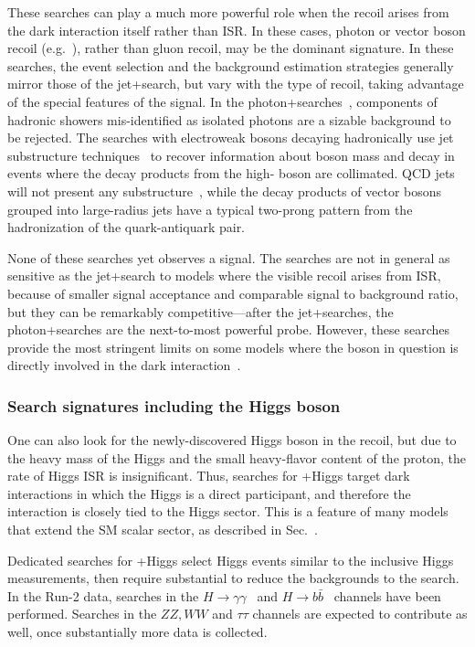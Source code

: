 These searches can play a much more powerful role when the recoil arises from the dark interaction itself rather than ISR.
In these cases, photon or vector boson recoil (e.g.~\cite{Birkedal:2004xn,Carpenter:2012rg}), rather than gluon recoil, may be the dominant signature.
In these searches, the event selection and the background estimation strategies generally mirror those of the jet+\MET search, but vary with the type of recoil, taking advantage of the special features of the signal.
In the photon+\MET searches~\cite{Aaboud:2017dor,CMS-PAS-EXO-16-014}, components of hadronic showers mis-identified as isolated photons are a sizable background to be rejected.
The searches with electroweak bosons decaying hadronically use jet substructure techniques~\cite{Sirunyan:2017jix,Aaboud:2016qgg} to recover information about boson mass and decay in events where the decay products from the high-\pt{} boson are collimated.
QCD jets will not present any substructure~\cite{Larkoski:2017jix}, while the decay products of vector bosons grouped into large-radius jets have a typical two-prong pattern from the hadronization of the quark-antiquark pair.

None of these searches yet observes a signal. The searches are not in general as sensitive as the jet+\MET search to models where the visible recoil arises from ISR, because of smaller signal acceptance and comparable signal to background ratio, but they can be remarkably competitive---after the jet+\MET searches, the photon+\MET searches are the next-to-most powerful probe.
However, these searches provide the most stringent limits on some models where the boson in question is directly involved in the dark interaction~\cite{Berlin:2014cfa}.

\subsubsection{Search signatures including the Higgs boson}

One can also look for the newly-discovered Higgs boson in the recoil, but due to the heavy mass of the Higgs and the small heavy-flavor content of the proton, the rate of Higgs ISR is insignificant. 
Thus, searches for \MET+Higgs target dark interactions in which the Higgs is a direct participant, and therefore the interaction is closely tied to the Higgs sector. 
This is a feature of many models that extend the SM scalar sector, as described in Sec.~\cite{sec:BSMMediatorModels}. 

Dedicated searches for \MET+Higgs select Higgs events similar to the inclusive Higgs measurements, then require substantial \MET to reduce the backgrounds to the search.
In the Run-2 data, searches in the $H \rightarrow \gamma\gamma$~\cite{CMS-PAS-EXO-16-054,Aaboud:2017uak} and $H \rightarrow b\bar{b}$~\cite{Aaboud:2017yqz} channels have been performed.
Searches in the $ZZ, WW$ and $\tau\tau$ channels are expected to contribute as well, once substantially more data is collected. 

